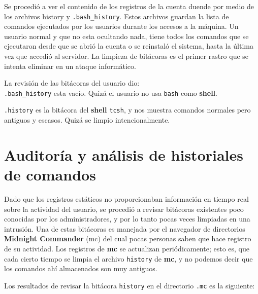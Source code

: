  
Se procedió a ver el contenido de los registros de la cuenta
duende por medio de los archivos history y \texttt{.bash\_history}. Estos
archivos guardan la lista de comandos ejecutados por los usuarios
durante los accesos a la máquina. Un usuario normal y que no esta
ocultando nada, tiene todos los comandos que se ejecutaron desde que
se abrió la cuenta o se reinstaló el sistema, hasta la última vez que
accedió al servidor. La limpieza de bitácoras es el primer rastro que
se intenta eliminar en un ataque informático.

 La revisión de las bitácoras del usuario dio:\\
 
 \texttt{.bash\_history} esta vacío. Quizá el usuario no usa \texttt{bash} como \textbf{shell}.
 
 \texttt{.history} es la bitácora del \textbf{shell} \texttt{tcsh}, y nos muestra comandos
normales pero antiguos y escasos. Quizá se limpio intencionalmente.

 \section{Auditoría y análisis de historiales de comandos}

Dado que los registros estáticos no proporcionaban información en tiempo real sobre la actividad del
usuario, se procedió a revisar bitácoras existentes poco conocidas por
los administradores, y por lo tanto pocas veces limpiadas en una
intrusión. Una de estas bitácoras es manejada por el navegador de
directorios \textbf{Midnight Commander} (mc) del cual pocas personas saben que
hace registro de su actividad. Los registros de \textbf{mc} se actualizan
periódicamente; esto es, que cada cierto tiempo se limpia el archivo
\texttt{history} de \textbf{mc}, y no podemos decir que los comandos ahí almacenados son
muy antiguos.

Los resultados de revisar la bitácora \texttt{history} en el directorio \texttt{.mc} es
la siguiente:

\vspace{1em}

